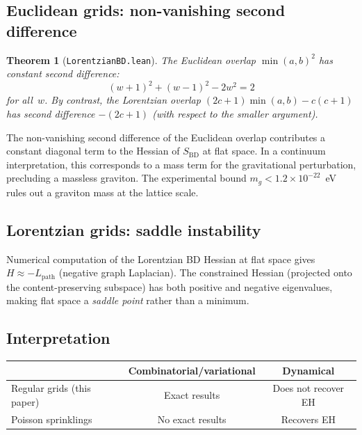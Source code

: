 \documentclass[11pt,a4paper]{article}
\newtheorem{theorem}{Theorem}[section]
\theoremstyle{remark}
\begin{document}
\subsection{Euclidean grids: non-vanishing second difference}

\begin{theorem}[\texttt{LorentzianBD.lean}]
\label{thm:eucmass}
The Euclidean overlap $\min(a,b)^2$ has constant second difference:
\[
  (w{+}1)^2 + (w{-}1)^2 - 2w^2 = 2
\]
for all~$w$. By contrast, the Lorentzian overlap $(2c{+}1)\min(a,b) - c(c{+}1)$
has second difference $-(2c{+}1)$ (with respect to the smaller argument).
\end{theorem}

The non-vanishing second difference of the Euclidean overlap contributes
a constant diagonal term to the Hessian of $S_{\mathrm{BD}}$ at flat space.
In a continuum interpretation, this corresponds to a mass term for the
gravitational perturbation, precluding a massless graviton.
The experimental bound $m_g < 1.2 \times 10^{-22}$~eV~\cite{LIGO2017}
rules out a graviton mass at the lattice scale.

\subsection{Lorentzian grids: saddle instability}

Numerical computation of the Lorentzian BD Hessian at flat space gives
$H \approx -L_{\mathrm{path}}$ (negative graph Laplacian). The constrained
Hessian (projected onto the content-preserving subspace) has both positive
and negative eigenvalues, making flat space a \emph{saddle point} rather
than a minimum.

\subsection{Interpretation}

\begin{center}
\begin{tabular}{lcc}
\toprule
& \textbf{Combinatorial/variational} & \textbf{Dynamical} \\
\midrule
Regular grids (this paper) & Exact results & Does not recover EH \\
Poisson sprinklings~\cite{BD2010} & No exact results & Recovers EH \\
\bottomrule
\end{tabular}
\end{center}
\end{document}
